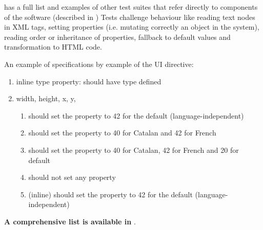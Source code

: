  has a full list and examples of other test suites that refer directly to components of the software (described in )
Tests challenge behaviour like reading text nodes in \ac{XML} tags, setting properties (i.e. mutating correctly an object in the system), reading order or inheritance of properties, fallback to default values and transformation to \ac{HTML} code.

An example of specifications by example of the UI directive:
\begin{enumerate}
	\item inline type property: should have type defined
	\item width, height, x, y, 
		\begin{enumerate}
			\item should set the property to 42 for the default (language-independent)
			\item should set the property to 40 for Catalan and 42 for French
			\item should set the property to 40 for Catalan, 42 for French and 20 for default
			\item should not set any property
			\item (inline) should set the property to 42 for the default (language-independent)
		\end{enumerate}
\end{enumerate}

\textbf{A comprehensive list is available in }.